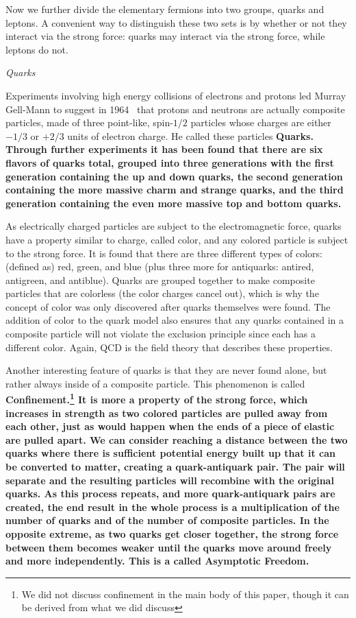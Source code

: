 \documentclass[12pt,epsf]{article}
\begin{document}
Now we further divide the elementary fermions into two groups, quarks
and leptons. A convenient way to distinguish these two sets is by
whether or not they interact via the strong force: quarks may interact
via the strong force, while leptons do not.

\begin{center}
\it Quarks \rm
\end{center}

Experiments involving high energy collisions of electrons and protons
led Murray Gell-Mann to suggest in 1964~\cite{Pickering} that protons
and neutrons are actually composite particles, made of three
point-like, spin-$1/2$ particles whose charges are either $-1/3$ or
$+2/3$ units of electron charge.  He called these particles \bf
Quarks\rm.  Through further experiments it has been found that there
are six flavors of quarks total, grouped into three generations with
the first generation containing the up and down quarks, the second
generation containing the more massive charm and strange quarks, and the
third generation containing the even more massive top and bottom quarks. 

As electrically charged particles are subject to the electromagnetic
force, quarks have a property similar to charge, called color, and any
colored particle is subject to the strong force. It is found that there
are three different types of colors: (defined as) red, green, and blue
(plus three more for antiquarks: antired, antigreen, and antiblue).
Quarks are grouped together to make composite particles that are
colorless (the color charges cancel out), which is why the concept of
color was only discovered after quarks themselves were found. The
addition of color to the quark model also ensures that any quarks
contained in a composite particle will not violate the exclusion
principle since each has a different color.  Again, QCD is the field
theory that describes these properties.

Another interesting feature of quarks is that they are never found
alone, but rather always inside of a composite particle. This
phenomenon is called \bf Confinement\rm.\footnote{We did not discuss
confinement in the main body of this paper, though it can be derived
from what we did discuss} It is more a property of the strong force,
which increases in strength as two colored particles are pulled away
from each other, just as would happen when the ends of a piece of
elastic are pulled apart. We can consider reaching a distance between
the two quarks where there is sufficient potential energy built up that
it can be converted to matter, creating a quark-antiquark pair. The
pair will separate and the resulting particles will recombine with the
original quarks.  As this process repeats, and more quark-antiquark pairs
are created, the end result in the whole process is a multiplication of the number of
quarks and of the number of composite particles. In the opposite
extreme, as two quarks get closer together, the strong force between
them becomes weaker until the quarks move around freely and more
independently. This is a called \bf Asymptotic Freedom.\rm
\end{document}
